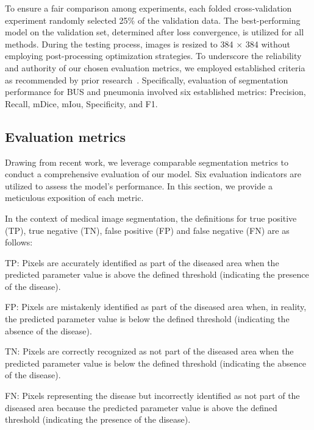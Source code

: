 \documentclass[review]{elsarticle}
\begin{document}
	To ensure a fair comparison among experiments, each folded cross-validation experiment randomly selected 25\% of the validation data. The best-performing model on the validation set, determined after loss convergence, is utilized for all methods. During the testing process, images is resized to 384 $ \times $ 384 without employing post-processing optimization strategies. To underscore the reliability and authority of our chosen evaluation metrics, we employed established criteria as recommended by prior research~\cite{hoorali2022irunet, chen2023dseu, iqbal2023bts}. Specifically, evaluation of segmentation performance for BUS and pneumonia involved six established metrics: Precision, Recall, mDice, mIou, Specificity, and F1.

	\subsection{Evaluation metrics}
	Drawing from recent work, we leverage comparable segmentation metrics to conduct a comprehensive evaluation of our model. Six evaluation indicators are utilized to assess the model's performance. In this section, we provide a meticulous exposition of each metric.

	In the context of medical image segmentation, the definitions for true positive (TP), true negative (TN), false positive (FP) and false negative (FN) are as follows:

	TP: Pixels are accurately identified as part of the diseased area when the predicted parameter value is above the defined threshold (indicating the presence of the disease).

	FP: Pixels are mistakenly identified as part of the diseased area when, in reality, the predicted parameter value is below the defined threshold (indicating the absence of the disease).

	TN: Pixels are correctly recognized as not part of the diseased area when the predicted parameter value is below the defined threshold (indicating the absence of the disease).

	FN: Pixels representing the disease but incorrectly identified as not part of the diseased area because the predicted parameter value is above the defined threshold (indicating the presence of the disease).
\end{document}
